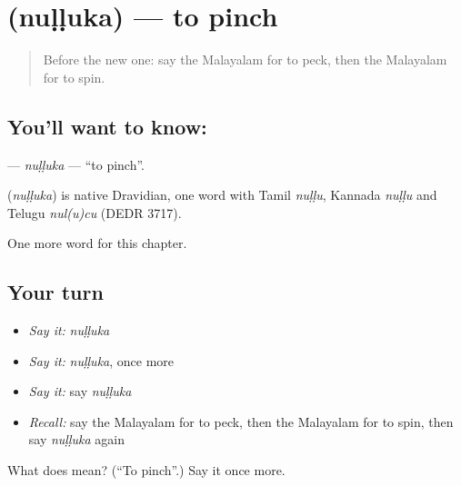 \section[\texorpdfstring{\ml{നുള്ളുക} (nuḷḷuka)}{നുള്ളുക (nuḷḷuka)}]{ (nuḷḷuka) — to pinch}

\label{lesson:ML-C273-nulluka}



\begin{quote}
Before the new one: say the Malayalam for to peck, then the Malayalam for to spin.
\end{quote}

\subsection*{You'll want to know: }
\textbf{} — \emph{nuḷḷuka} — \textquotedblleft{}to pinch\textquotedblright{}.

\begin{cousinweb}
\textbf{} (\emph{nuḷḷuka}) is native Dravidian, one word with Tamil \emph{nuḷḷu}, Kannada \emph{nuḷḷu} and Telugu \emph{nul(u)cu} (DEDR 3717).
\end{cousinweb}

\begin{grammarlens}[title={What you've built}]
One more word for this chapter.
\end{grammarlens}

\subsection*{Your turn}
\begin{itemize}
\raggedright
  \item \emph{Say it:} \emph{nuḷḷuka}
  \item \emph{Say it:} \emph{nuḷḷuka}, once more
  \item \emph{Say it:} say \emph{nuḷḷuka}
  \item \emph{Recall:} say the Malayalam for to peck, then the Malayalam for to spin, then say \emph{nuḷḷuka} again
\end{itemize}

\begin{tcolorbox}[breakable,colback=teal!4,colframe=teal!35!black,title={Before you move on}]
What does  mean? (\textquotedblleft{}To pinch\textquotedblright{}.) Say it once more.
\end{tcolorbox}
